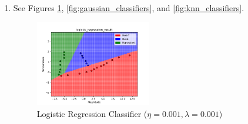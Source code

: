 \documentclass[submit]{harvardml}
\begin{document}
\begin{enumerate}
	\item See Figures \ref{fig:logistic_regression_classifier}, \ref{fig:gaussian_classifiers}, and \ref{fig:knn_classifiers}.
	
		\begin{figure}[h]
			\centering
			\includegraphics[width=0.475\textwidth]{logistic_regression_result}
			\caption{Logistic Regression Classifier ($\eta = 0.001, \lambda = 0.001$)}
			\label{fig:logistic_regression_classifier}
		\end{figure}
		

\end{enumerate}
\end{document}
